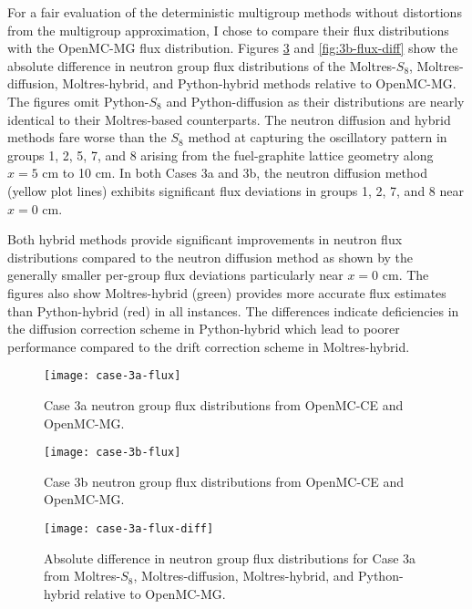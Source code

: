 For a fair evaluation of the deterministic multigroup methods without distortions from the
multigroup approximation, I chose to compare their flux distributions with the OpenMC-MG flux
distribution. Figures \ref{fig:3a-flux-diff} and \ref{fig:3b-flux-diff} show the absolute
difference in neutron group flux distributions of the Moltres-$S_8$, Moltres-diffusion,
Moltres-hybrid, and Python-hybrid methods relative to OpenMC-MG. The figures omit Python-$S_8$ and
Python-diffusion as their distributions are nearly identical to their Moltres-based counterparts.
The neutron diffusion and hybrid methods fare worse than the $S_8$ method at capturing the
oscillatory pattern in groups 1, 2, 5, 7, and 8 arising from the fuel-graphite lattice geometry
along $x=5$ cm to 10 cm. In both Cases 3a and 3b, the neutron diffusion method (yellow plot lines)
exhibits significant flux deviations in groups 1, 2, 7, and 8 near $x=0$ cm.

Both hybrid methods
provide significant improvements in neutron flux distributions compared to the neutron diffusion
method as shown by the generally smaller per-group flux deviations particularly near $x=0$ cm. The
figures also show Moltres-hybrid (green) provides more accurate flux estimates than
Python-hybrid (red) in all instances. The differences indicate deficiencies in the diffusion
correction scheme in Python-hybrid which lead to poorer performance compared to the drift
correction scheme in Moltres-hybrid.

\begin{figure}[htb!]
  \centering
  \texttt{[image: case-3a-flux]}
  \caption{Case 3a neutron group flux distributions from OpenMC-CE and OpenMC-MG.}
  \label{fig:3a-flux}
\end{figure}

\begin{figure}[htb!]
  \centering
  \texttt{[image: case-3b-flux]}
  \caption{Case 3b neutron group flux distributions from OpenMC-CE and OpenMC-MG.}
  \label{fig:3b-flux}
\end{figure}

\begin{figure}[htb!]
  \centering
  \texttt{[image: case-3a-flux-diff]}
  \caption{Absolute difference in neutron group flux distributions for Case 3a from Moltres-$S_8$,
  Moltres-diffusion, Moltres-hybrid, and Python-hybrid relative to OpenMC-MG.}
  \label{fig:3a-flux-diff}
\end{figure}

